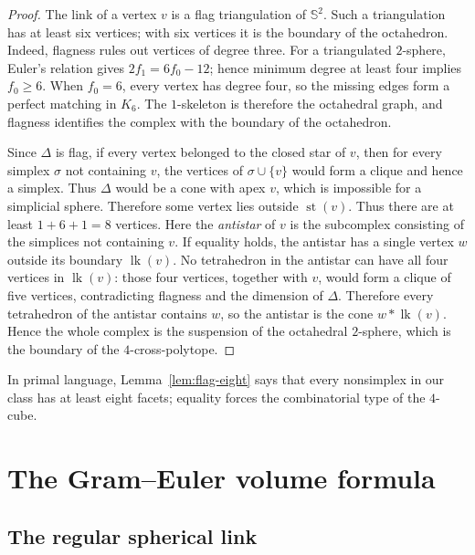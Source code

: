 \documentclass[12pt,a4paper]{article}
\theoremstyle{thmstyleone}
\theoremstyle{thmstylethree}
\theoremstyle{thmstyletwo}
\newcommand{\SSph}{\mathbb S}
\newcommand{\st}{\operatorname{st}}
\newcommand{\lk}{\operatorname{lk}}
\begin{document}
\begin{proof}
The link of a vertex $v$ is a flag triangulation of $\SSph^2$.  Such a
triangulation has at least six vertices; with six vertices it is the boundary
of the octahedron.  Indeed, flagness rules out vertices of degree three.
For a triangulated $2$-sphere, Euler's relation gives
$2f_1=6f_0-12$; hence minimum degree at least four implies $f_0\geq6$.
When $f_0=6$, every vertex has degree four, so the missing edges form a
perfect matching in $K_6$.  The $1$-skeleton is therefore the octahedral
graph, and flagness identifies the complex with the boundary of the
octahedron.

Since $\Delta$ is flag, if every vertex belonged to the closed star of $v$, then for every simplex $\sigma$ not containing $v$, the vertices of $\sigma \cup \{v\}$ would form a clique and hence a simplex. 
Thus $\Delta$ would be a cone with apex $v$, which is impossible for a simplicial sphere. Therefore some vertex lies outside $\st(v)$.
Thus there are at least
$1+6+1=8$ vertices.  Here the \emph{antistar} of $v$ is the subcomplex
consisting of the simplices not containing $v$.  If equality holds, the
antistar has a single vertex $w$ outside its boundary $\lk(v)$.  No
tetrahedron in the antistar can have all four vertices in $\lk(v)$: those
four vertices, together with $v$, would form a clique of five vertices,
contradicting flagness and the dimension of $\Delta$.  Therefore every
tetrahedron of the antistar contains $w$, so the antistar is the cone
$w*\lk(v)$.  Hence the whole complex is the suspension of the octahedral
$2$-sphere, which is the boundary of the $4$-cross-polytope.
\end{proof}

In primal language, Lemma~\ref{lem:flag-eight} says that every nonsimplex in
our class has at least eight facets; equality forces the combinatorial type
of the $4$-cube.

\section{The Gram--Euler volume formula}\label{sec:volume}

\subsection{The regular spherical link}
\end{document}
